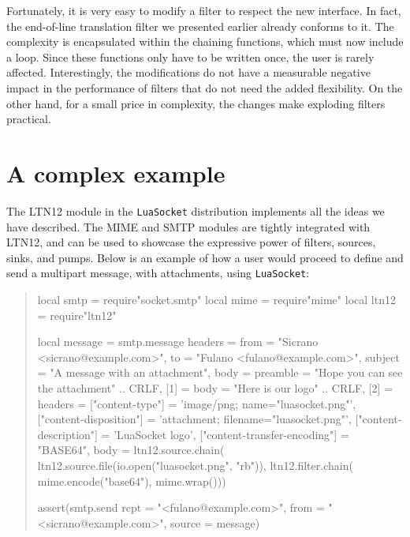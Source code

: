 \documentclass[10pt]{article}
\begin{document}
			Fortunately, it is very easy to modify a filter to respect
			the new interface. In fact, the end-of-line translation
			filter we presented earlier already conforms to it.  The
			complexity is encapsulated within the chaining functions,
			which must now include a loop. Since these functions only
			have to be written once, the user is rarely affected.
			Interestingly, the modifications do not have a measurable
			negative impact in the performance of filters that do
			not need the added flexibility. On the other hand, for a
			small price in complexity, the changes make exploding
			filters practical.
			
			\section{A complex example}
			
			The LTN12 module in the \texttt{LuaSocket} distribution
			implements all the ideas we have described. The MIME
			and SMTP modules are tightly integrated with LTN12, 
			and can be used to showcase the expressive power of filters,
			sources, sinks, and pumps. Below is an example 
			of how a user would proceed to define and send a
			multipart message, with attachments, using \texttt{LuaSocket}:
			\begin{quote}
			\begin{mime}
			local smtp = require"socket.smtp"
			local mime = require"mime"
			local ltn12 = require"ltn12"
			
			local message = smtp.message{
            headers = {
        from = "Sicrano <sicrano@example.com>",
        to = "Fulano <fulano@example.com>",
        subject = "A message with an attachment"},
            body = {
        preamble = "Hope you can see the attachment" .. CRLF,
        [1] = {
        body = "Here is our logo" .. CRLF},
        [2] = {
        headers = {
    ["content-type"] = 'image/png; name="luasocket.png"',
    ["content-disposition"] = 
    'attachment; filename="luasocket.png"',
    ["content-description"] = 'LuaSocket logo',
    ["content-transfer-encoding"] = "BASE64"},
        body = ltn12.source.chain(
    ltn12.source.file(io.open("luasocket.png", "rb")),
    ltn12.filter.chain(
    mime.encode("base64"),
    mime.wrap()))}}}
			
			assert(smtp.send{
            rcpt = "<fulano@example.com>",
            from = "<sicrano@example.com>",
            source = message})
			\end{mime}
			\end{quote}
			
\end{document}

